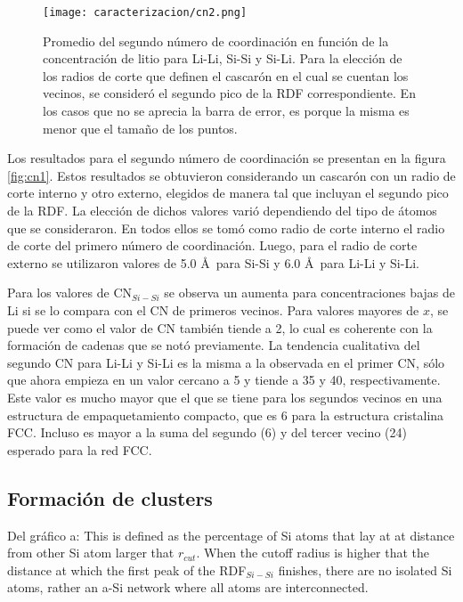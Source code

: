 \begin{figure}[th]
    \centering
    \texttt{[image: caracterizacion/cn2.png]}
    \caption{Promedio del segundo número de coordinación en función de la 
    concentración de litio para Li-Li, Si-Si y Si-Li. Para la elección de los 
    radios de corte que definen el cascarón en el cual se cuentan los vecinos,
    se consideró el segundo pico de la RDF correspondiente. En los casos que no 
    se aprecia la barra de error, es porque la misma es menor que el tamaño de 
    los puntos.}
    \label{fig:cn2}
\end{figure}
Los resultados para el segundo número de coordinación se presentan en la figura 
\ref{fig:cn1}. Estos resultados se obtuvieron considerando un cascarón con un 
radio de corte interno y otro externo, elegidos de manera tal que incluyan el 
segundo pico de la RDF. La elección de dichos valores varió dependiendo del tipo
de átomos que se consideraron. En todos ellos se tomó como radio de corte interno 
el radio de corte del primero número de coordinación. Luego, para el radio de 
corte externo se utilizaron valores de 5.0 \AA\ para Si-Si y 6.0 \AA\ para Li-Li
y Si-Li.

Para los valores de CN$_{Si-Si}$ se observa un aumenta para concentraciones bajas
de Li si se lo compara con el CN de primeros vecinos. Para valores mayores de $x$,
se puede ver como el valor de CN también tiende a 2, lo cual es coherente con la
formación de cadenas que se notó previamente. La tendencia cualitativa del segundo
CN para Li-Li y Si-Li es la misma a la observada en el primer CN, sólo que ahora
empieza en un valor cercano a 5 y tiende a 35 y 40, respectivamente. Este valor 
es mucho mayor que el que se tiene para los segundos vecinos en una estructura 
de empaquetamiento compacto, que es 6 para la estructura cristalina FCC. Incluso 
es mayor a la suma del segundo (6) y del tercer vecino (24) esperado para la red 
FCC.

\subsection{Formación de clusters}

Del gráfico a: This is defined as the percentage of Si atoms that lay at at 
distance from other Si atom larger that $r_{cut}$. When the cutoff radius is 
higher that the distance at which the first peak of the RDF$_{Si-Si}$ finishes, 
there are no isolated Si atoms, rather an a-Si network where all atoms are 
interconnected.

